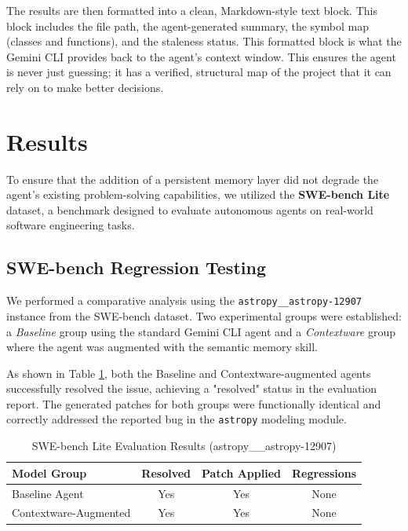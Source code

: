 \documentclass[conference]{IEEEtran}
\begin{document}
The results are then formatted into a clean, Markdown-style text block. This block includes the file path, the agent-generated summary, the symbol map (classes and functions), and the staleness status. This formatted block is what the Gemini CLI provides back to the agent's context window. This ensures the agent is never just guessing; it has a verified, structural map of the project that it can rely on to make better decisions.

\section{Results}

To ensure that the addition of a persistent memory layer did not degrade the agent's existing problem-solving capabilities, we utilized the \textbf{SWE-bench Lite} dataset, a benchmark designed to evaluate autonomous agents on real-world software engineering tasks.

\subsection{SWE-bench Regression Testing}
We performed a comparative analysis using the \texttt{astropy\_\_astropy-12907} instance from the SWE-bench dataset. Two experimental groups were established: a \textit{Baseline} group using the standard Gemini CLI agent and a \textit{Contextware} group where the agent was augmented with the semantic memory skill.

As shown in Table \ref{tab:swe-bench}, both the Baseline and Contextware-augmented agents successfully resolved the issue, achieving a "resolved" status in the evaluation report. The generated patches for both groups were functionally identical and correctly addressed the reported bug in the \texttt{astropy} modeling module. 

\begin{table}[htbp]
    \centering
    \caption{SWE-bench Lite Evaluation Results (astropy\_\_astropy-12907)}
    \label{tab:swe-bench}
    \begin{tabular}{|l|c|c|c|}
        \hline
        \textbf{Model Group} & \textbf{Resolved} & \textbf{Patch Applied} & \textbf{Regressions} \\ \hline
        Baseline Agent & Yes & Yes & None \\ \hline
        Contextware-Augmented & Yes & Yes & None \\ \hline
    \end{tabular}
\end{table}
\end{document}
